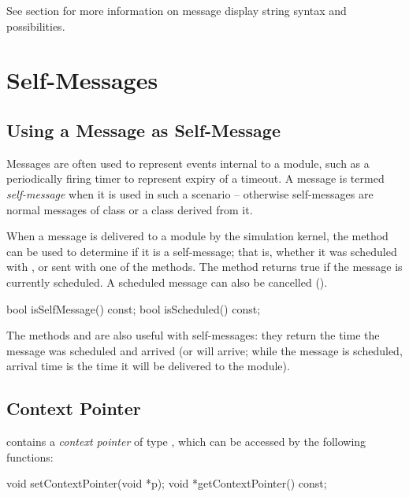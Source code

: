 See section \label{sec:graphics:message-displaystrings} for
more information on message display string syntax and possibilities.



\section{Self-Messages}
\label{sec:msgs:self-messages}

\subsection{Using a Message as Self-Message}
\label{sec:messages:using-message-as-self-message}

Messages are often used to represent events internal to a module,
such as a periodically firing timer to represent expiry of a timeout.
A message is termed \textit{self-message} when it is used
in such a scenario -- otherwise self-messages are normal messages
of class  or a class derived from it.

When a message is delivered to a module by the simulation kernel, the
 method can be used to determine if it is
a self-message; that is, whether it was scheduled with ,
or sent with one of the  methods. The 
method returns true if the message is currently scheduled. A scheduled
message can also be cancelled ().

\begin{cpp}
bool isSelfMessage() const;
bool isScheduled() const;
\end{cpp}

The methods  and  are also
useful with self-messages: they return the time the message was scheduled
and arrived (or will arrive; while the message is scheduled, arrival time
is the time it will be delivered to the module).


\subsection{Context Pointer}
\label{sec:messages:context-pointer}

 contains a \textit{context pointer} of type ,
which can be accessed by the following functions:

\begin{cpp}
void setContextPointer(void *p);
void *getContextPointer() const;
\end{cpp}

